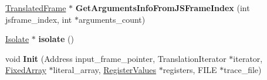 \begin{DoxyCompactItemize}
\item 
\hyperlink{classv8_1_1internal_1_1_translated_frame}{Translated\+Frame} $\ast$ {\bfseries Get\+Arguments\+Info\+From\+J\+S\+Frame\+Index} (int jsframe\+\_\+index, int $\ast$arguments\+\_\+count)\hypertarget{classv8_1_1internal_1_1_translated_state_a38fa0d6f1798ae6ed395a398f263306e}{}\label{classv8_1_1internal_1_1_translated_state_a38fa0d6f1798ae6ed395a398f263306e}

\item 
\hyperlink{classv8_1_1internal_1_1_isolate}{Isolate} $\ast$ {\bfseries isolate} ()\hypertarget{classv8_1_1internal_1_1_translated_state_a3f7e0c9a867318e6ca1277a882667027}{}\label{classv8_1_1internal_1_1_translated_state_a3f7e0c9a867318e6ca1277a882667027}

\item 
void {\bfseries Init} (Address input\+\_\+frame\+\_\+pointer, Translation\+Iterator $\ast$iterator, \hyperlink{classv8_1_1internal_1_1_fixed_array}{Fixed\+Array} $\ast$literal\+\_\+array, \hyperlink{classv8_1_1internal_1_1_register_values}{Register\+Values} $\ast$registers, F\+I\+LE $\ast$trace\+\_\+file)\hypertarget{classv8_1_1internal_1_1_translated_state_a20961a7b0434c5eed1120bf9fbcc79d3}{}\label{classv8_1_1internal_1_1_translated_state_a20961a7b0434c5eed1120bf9fbcc79d3}

\end{DoxyCompactItemize}
